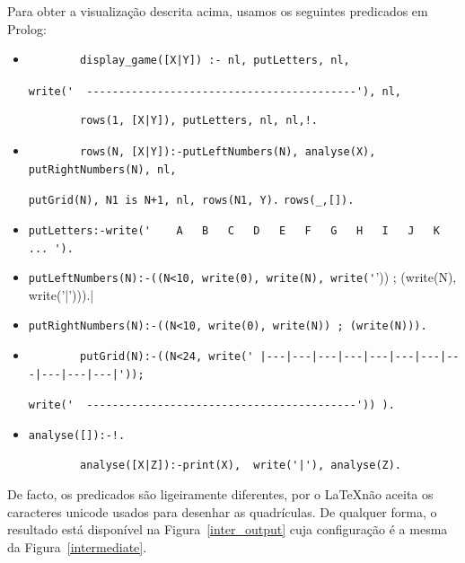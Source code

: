 \documentclass[a4paper]{article}
\begin{document}
Para obter a visualização descrita acima, usamos os seguintes predicados em Prolog:
\begin{itemize}
	\item 
	\begin{verbatim}
		display_game([X|Y]) :- nl, putLetters, nl,
	\end{verbatim}
	\verb|write('  ------------------------------------------'), nl,|
	\begin{verbatim}
		rows(1, [X|Y]), putLetters, nl, nl,!.
	\end{verbatim}
	\item
	\begin{verbatim}
		rows(N, [X|Y]):-putLeftNumbers(N), analyse(X), putRightNumbers(N), nl,
	\end{verbatim}
	\verb|putGrid(N), N1 is N+1, nl, rows(N1, Y).|\linebreak
	\verb|rows(_,[]).|
	\item
	\verb|putLetters:-write('    A   B   C   D   E   F   G   H   I   J   K   ... ').|
	\item
	\verb|putLeftNumbers(N):-((N<10, write(0), write(N), write('|')) ; (write(N), write('|'))).|
	\item
	\verb|putRightNumbers(N):-((N<10, write(0), write(N)) ; (write(N))).|
	\item
	\begin{verbatim}
		putGrid(N):-((N<24, write(' |---|---|---|---|---|---|---|---|---|---|---|'));
	\end{verbatim}
	\verb|write('  ------------------------------------------')) ).|
	\item
	\verb|analyse([]):-!.|
	\begin{verbatim}
		analyse([X|Z]):-print(X),  write('|'), analyse(Z).
	\end{verbatim}
\end{itemize}
De facto, os predicados são ligeiramente diferentes, por o \LaTeX não aceita os caracteres unicode usados para desenhar as quadrículas. De qualquer forma, o resultado está disponível na Figura~\ref{inter_output} cuja configuração é a mesma da Figura~\ref{intermediate}.
\end{document}
